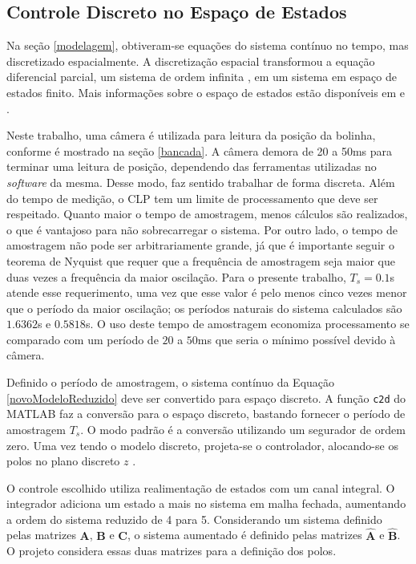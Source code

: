 \subsection{Controle Discreto no Espaço de Estados}
 Na seção \ref{modelagem}, obtiveram-se equações do sistema contínuo no tempo, mas discretizado espacialmente. A discretização espacial transformou a equação diferencial parcial, um sistema de ordem infinita \cite{fabricioIFAC}, em um sistema em espaço de estados finito. Mais informações sobre o espaço de estados estão disponíveis em \cite{Ogata:2010} e \cite{OgataDiscrete:1995}. 
 
 Neste trabalho, uma câmera é utilizada para leitura da posição da bolinha, conforme é mostrado na seção \ref{bancada}. A câmera demora de 20 a 50ms para terminar uma leitura de posição, dependendo das ferramentas utilizadas no \textit{software} da mesma. Desse modo, faz sentido trabalhar de forma discreta. Além do tempo de medição, o CLP tem um limite de processamento que deve ser respeitado. Quanto maior o tempo de amostragem, menos cálculos são realizados, o que é vantajoso para não sobrecarregar o sistema. Por outro lado, o tempo de amostragem não pode ser arbitrariamente grande, já que é importante seguir o teorema de Nyquist \cite{OgataDiscrete:1995} que requer que a frequência de amostragem seja maior que duas vezes a frequência da maior oscilação. Para o presente trabalho, $T_s = 0.1$s atende esse requerimento, uma vez que esse valor é pelo menos cinco vezes menor que o período da maior oscilação; os períodos naturais do sistema calculados são $1.6362$s e $0.5818$s. O uso deste tempo de amostragem economiza processamento se comparado com um período de $20$ a $50$ms que seria o mínimo possível devido à câmera.

 Definido o período de amostragem, o sistema contínuo da Equação \ref{novoModeloReduzido} deve ser convertido para espaço discreto. A função \texttt{c2d} do MATLAB \cite{c2d} faz a conversão para o espaço discreto, bastando fornecer o período de amostragem $T_s$. O modo padrão é a conversão utilizando um segurador de ordem zero. Uma vez tendo o modelo discreto, projeta-se o controlador, alocando-se os polos no plano discreto $z$ \cite{OgataDiscrete:1995}.

 O controle escolhido utiliza realimentação de estados com um canal integral. O integrador adiciona um estado a mais no sistema em malha fechada, aumentando a ordem do sistema reduzido de 4 para 5. Considerando um sistema definido pelas matrizes $\mathbf{A}$, $\mathbf{B}$ e $\mathbf{C}$, o sistema aumentado é definido pelas matrizes $\mathbf{\hat{A}}$ e $\mathbf{\hat{B}}$. O projeto considera essas duas matrizes para a definição dos polos.

